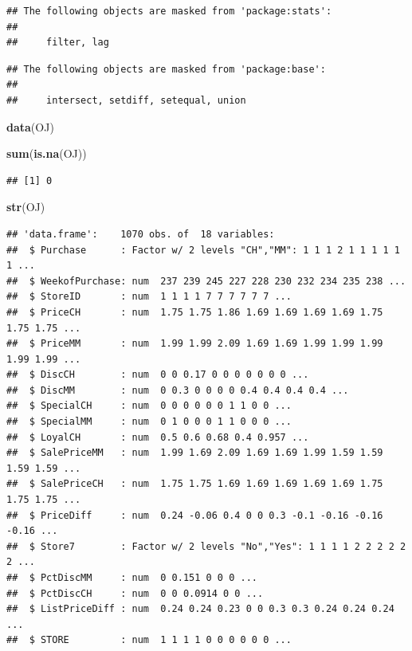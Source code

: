 \documentclass[
]{article}
\newenvironment{Shaded}{\begin{snugshade}}{\end{snugshade}}
\newcommand{\FunctionTok}[1]{\textcolor[rgb]{0.13,0.29,0.53}{\textbf{#1}}}
\newcommand{\NormalTok}[1]{#1}
\begin{document}
\begin{verbatim}
## The following objects are masked from 'package:stats':
## 
##     filter, lag
\end{verbatim}

\begin{verbatim}
## The following objects are masked from 'package:base':
## 
##     intersect, setdiff, setequal, union
\end{verbatim}

\begin{Shaded}
\begin{Highlighting}[]
\FunctionTok{data}\NormalTok{(OJ)}

\FunctionTok{sum}\NormalTok{(}\FunctionTok{is.na}\NormalTok{(OJ))}
\end{Highlighting}
\end{Shaded}

\begin{verbatim}
## [1] 0
\end{verbatim}

\begin{Shaded}
\begin{Highlighting}[]
\FunctionTok{str}\NormalTok{(OJ)}
\end{Highlighting}
\end{Shaded}

\begin{verbatim}
## 'data.frame':    1070 obs. of  18 variables:
##  $ Purchase      : Factor w/ 2 levels "CH","MM": 1 1 1 2 1 1 1 1 1 1 ...
##  $ WeekofPurchase: num  237 239 245 227 228 230 232 234 235 238 ...
##  $ StoreID       : num  1 1 1 1 7 7 7 7 7 7 ...
##  $ PriceCH       : num  1.75 1.75 1.86 1.69 1.69 1.69 1.69 1.75 1.75 1.75 ...
##  $ PriceMM       : num  1.99 1.99 2.09 1.69 1.69 1.99 1.99 1.99 1.99 1.99 ...
##  $ DiscCH        : num  0 0 0.17 0 0 0 0 0 0 0 ...
##  $ DiscMM        : num  0 0.3 0 0 0 0 0.4 0.4 0.4 0.4 ...
##  $ SpecialCH     : num  0 0 0 0 0 0 1 1 0 0 ...
##  $ SpecialMM     : num  0 1 0 0 0 1 1 0 0 0 ...
##  $ LoyalCH       : num  0.5 0.6 0.68 0.4 0.957 ...
##  $ SalePriceMM   : num  1.99 1.69 2.09 1.69 1.69 1.99 1.59 1.59 1.59 1.59 ...
##  $ SalePriceCH   : num  1.75 1.75 1.69 1.69 1.69 1.69 1.69 1.75 1.75 1.75 ...
##  $ PriceDiff     : num  0.24 -0.06 0.4 0 0 0.3 -0.1 -0.16 -0.16 -0.16 ...
##  $ Store7        : Factor w/ 2 levels "No","Yes": 1 1 1 1 2 2 2 2 2 2 ...
##  $ PctDiscMM     : num  0 0.151 0 0 0 ...
##  $ PctDiscCH     : num  0 0 0.0914 0 0 ...
##  $ ListPriceDiff : num  0.24 0.24 0.23 0 0 0.3 0.3 0.24 0.24 0.24 ...
##  $ STORE         : num  1 1 1 1 0 0 0 0 0 0 ...
\end{verbatim}
\end{document}
